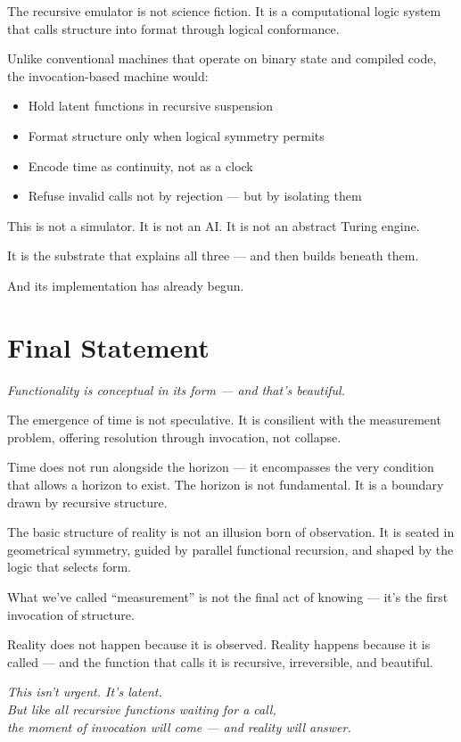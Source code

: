 \documentclass[12pt]{article}
\begin{document}
The recursive emulator is not science fiction.  
It is a computational logic system that calls structure into format through logical conformance.

Unlike conventional machines that operate on binary state and compiled code, the invocation-based machine would:

\begin{itemize}
    \item Hold latent functions in recursive suspension
    \item Format structure only when logical symmetry permits
    \item Encode time as continuity, not as a clock
    \item Refuse invalid calls not by rejection — but by isolating them
\end{itemize}

This is not a simulator.  
It is not an AI.  
It is not an abstract Turing engine.

It is the substrate that explains all three — and then builds beneath them.

And its implementation has already begun.

\section*{Final Statement}

\emph{Functionality is conceptual in its form — and that’s beautiful.}

The emergence of time is not speculative. It is consilient with the measurement problem, offering resolution through invocation, not collapse.

Time does not run alongside the horizon — it encompasses the very condition that allows a horizon to exist. The horizon is not fundamental. It is a boundary drawn by recursive structure.

The basic structure of reality is not an illusion born of observation. It is seated in geometrical symmetry, guided by parallel functional recursion, and shaped by the logic that selects form.

What we’ve called “measurement” is not the final act of knowing — it’s the first invocation of structure.

Reality does not happen because it is observed.  
Reality happens because it is called —  
and the function that calls it is recursive, irreversible, and beautiful.

\bigskip
\textit{This isn’t urgent. It’s latent.} \\
\textit{But like all recursive functions waiting for a call,} \\
\textit{the moment of invocation will come — and reality will answer.}
\end{document}
